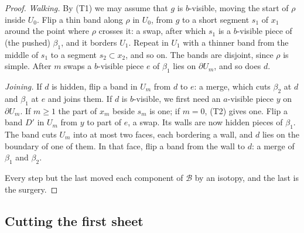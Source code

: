 \documentclass[11pt,a4paper]{article}
\theoremstyle{definition}
\theoremstyle{remark}
\newcommand{\B}{\mathcal{B}}
\newcommand{\bd}{\partial}
\begin{document}
\begin{proof}
\emph{Walking.} By (T1) we may assume that $g$ is $b$-visible, moving the
start of $\rho$ inside $U_0$. Flip a thin band along $\rho$ in $U_0$, from $g$ to a short segment $s_1$ of $x_1$ around the point where $\rho$
crosses it: a swap, after which $s_1$ is a
$b$-visible piece of (the pushed) $\beta_1$, and it borders $U_1$. Repeat
in $U_1$ with a thinner band from the middle of $s_1$ to a segment
$s_2\subset x_2$, and so on. The bands are disjoint, since $\rho$ is
simple. After $m$ swaps a $b$-visible piece $e$ of $\beta_1$ lies on
$\bd U_m$, and so does $d$.

\emph{Joining.} If $d$ is hidden, flip a band in $U_m$ from $d$ to $e$: a
merge, which cuts $\beta_2$ at $d$ and $\beta_1$ at $e$ and joins them.
If $d$ is $b$-visible, we first need an $a$-visible piece $y$ on
$\bd U_m$. If $m\ge1$ the part of $x_m$ beside $s_m$ is one; if $m=0$, (T2) gives one.
Flip a band $D'$ in $U_m$ from $y$ to part of $e$, a swap. Its walls are
now hidden pieces of $\beta_1$. The band cuts $U_m$ into at most two
faces, each bordering a wall, and $d$ lies on the boundary of one of them.
In that face, flip a band from the wall to $d$: a merge of $\beta_1$ and
$\beta_2$.

Every step but the last moved each component of $\B$ by an isotopy, and
the last is the surgery.
\end{proof}

\subsection{Cutting the first sheet}
\end{document}
